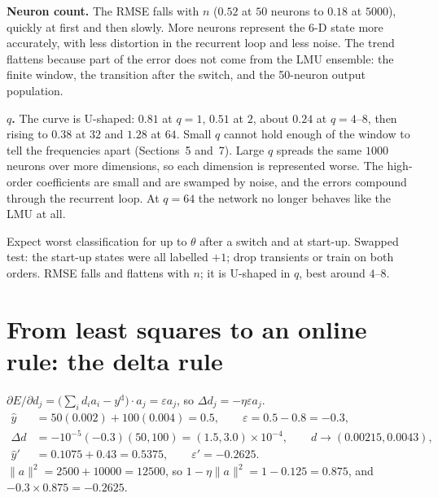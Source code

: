 \documentclass[11pt,letterpaper]{article}
\newcommand{\ans}[1]{\par\vspace{4pt}{\bfseries #1}\quad}
\begin{document}
\textbf{Neuron count.} The RMSE falls with $n$ ($0.52$ at $50$ neurons to $0.18$ at $5000$), quickly at first and then slowly. More neurons represent the 6-D state more accurately, with less distortion in the recurrent loop and less noise. The trend flattens because part of the error does not come from the LMU ensemble: the finite window, the transition after the switch, and the 50-neuron output population.

\textbf{$q$.} The curve is U-shaped: $0.81$ at $q = 1$, $0.51$ at $2$, about $0.24$ at $q = 4$--$8$, then rising to $0.38$ at $32$ and $1.28$ at $64$. Small $q$ cannot hold enough of the window to tell the frequencies apart (Sections~5 and~7). Large $q$ spreads the same $1000$ neurons over more dimensions, so each dimension is represented worse. The high-order coefficients are small and are swamped by noise, and the errors compound through the recurrent loop. At $q = 64$ the network no longer behaves like the LMU at all.
\begin{center}
\end{center}
\begin{result}
Expect worst classification for up to $\theta$ after a switch and at start-up. Swapped test: the start-up states were all labelled $+1$; drop transients or train on both orders. RMSE falls and flattens with $n$; it is U-shaped in $q$, best around $4$--$8$.
\end{result}

\section{From least squares to an online rule: the delta rule}

\ans{Q1}
$\partial E/\partial d_j = \bigl(\sum_i d_ia_i - y^{\mathrm d}\bigr)\cdot a_j = \varepsilon a_j$, so $\Delta d_j = -\eta\varepsilon a_j$.
\begin{align*}
\hat y &= 50(0.002) + 100(0.004) = 0.5, \qquad \varepsilon = 0.5 - 0.8 = -0.3,\\
\Delta d &= -10^{-5}(-0.3)(50, 100) = (1.5, 3.0)\times10^{-4}, \qquad d \to (0.00215, 0.0043),\\
\hat y' &= 0.1075 + 0.43 = 0.5375, \qquad \varepsilon' = -0.2625.
\end{align*}
$\|a\|^2 = 2500 + 10000 = 12500$, so $1 - \eta\|a\|^2 = 1 - 0.125 = 0.875$, and $-0.3 \times 0.875 = -0.2625$. \checkmark
\end{document}
